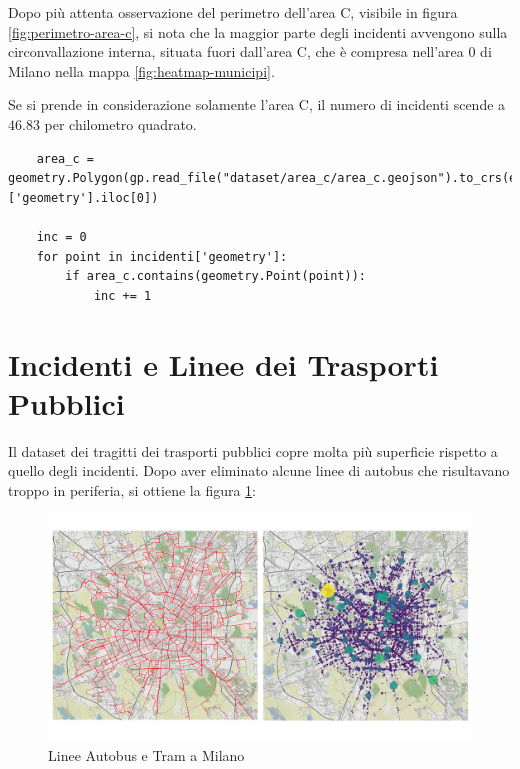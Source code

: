 \documentclass[a4paper]{report}
\begin{document}
Dopo più attenta osservazione del perimetro dell'area C, visibile in figura \ref{fig:perimetro-area-c}, 
si nota che la maggior parte degli incidenti avvengono sulla circonvallazione interna, 
situata fuori dall'area C, che è compresa nell'area 0 di Milano nella mappa \ref{fig:heatmap-municipi}.

Se si prende in considerazione solamente l'area C, il numero di incidenti scende a $46.83$ per chilometro quadrato.

\begin{lstlisting}
    area_c = geometry.Polygon(gp.read_file("dataset/area_c/area_c.geojson").to_crs(epsg=3857)['geometry'].iloc[0])

    inc = 0
    for point in incidenti['geometry']: 
        if area_c.contains(geometry.Point(point)): 
            inc += 1
\end{lstlisting}

\section{Incidenti e Linee dei Trasporti Pubblici}

Il dataset dei tragitti dei trasporti pubblici copre molta più superficie rispetto a 
quello degli incidenti.
Dopo aver eliminato alcune linee di autobus che risultavano troppo in periferia, 
si ottiene la figura \ref{fig:geo-trasporti}: 

\begin{figure}
    \includegraphics[width=\linewidth]{../src/atm/linee_atm.png}
    \caption{Linee Autobus e Tram a Milano}
    \label{fig:geo-trasporti}
\end{figure}
\end{document}
